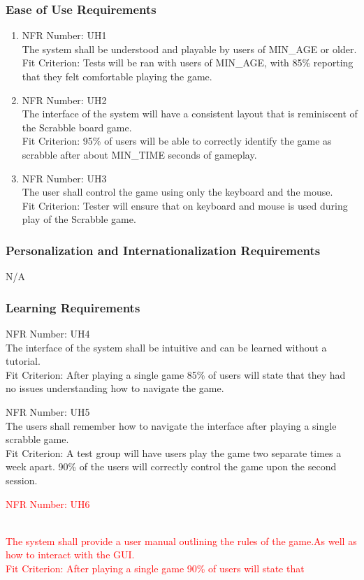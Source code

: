 \documentclass[12pt, titlepage]{article}
\begin{document}
\subsubsection{Ease of Use Requirements}
\begin{enumerate}
    \item NFR Number: UH1\\ %
    The system shall be understood and playable by users of MIN\_AGE or older.\\
    Fit Criterion: Tests will be ran with users of MIN\_AGE, with 85\% reporting that they felt comfortable playing the game.
    \item NFR Number: UH2\\
    The interface of the system will have a consistent layout that is reminiscent of the Scrabble board game.\\
    Fit Criterion: 95\% of users will be able to correctly identify the game as scrabble after about MIN\_TIME seconds of gameplay. 
    \item NFR Number: UH3\\
    The user shall control the game using only the keyboard and the mouse.\\
    Fit Criterion: Tester will ensure that on keyboard and mouse is used during play of the Scrabble game.
\end{enumerate}
\subsubsection{Personalization and Internationalization Requirements}
N/A
\subsubsection{Learning Requirements}
\begin{enumerate}
    \item NFR Number: UH4\\ %
    The interface of the system shall be intuitive and can be learned without a tutorial.\\
    Fit Criterion: After playing a single game 85\% of users will state that they had no issues understanding how to navigate the game. 
    \item NFR Number: UH5\\ %
    The users shall remember how to navigate the interface after playing a single scrabble game. \\
    Fit Criterion: A test group will have users play the game two separate times a week apart. 90\% of the users will correctly control the game upon the second session. 
     
    \textcolor{red}{\item{\textcolor{red}{NFR Number: UH6}}}\\
    \textcolor{red}{The system shall provide a user manual outlining the rules of the game.As well as how to interact with the GUI.}\\
    \textcolor{red}{Fit Criterion: After playing a single game 90\% of users will state that}
\end{enumerate}
\end{document}
